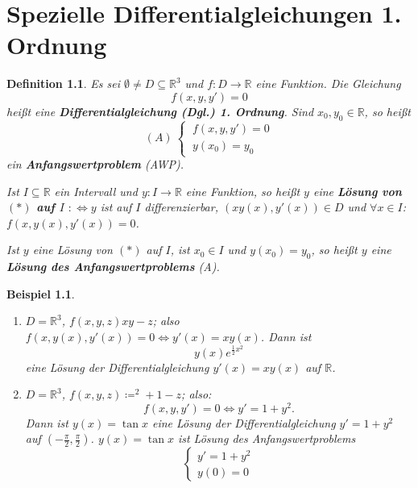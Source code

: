 \documentclass[12pt]{extreport} %
\newcommand{\R}{\mathbb{R}}
\theoremstyle{named}
\theoremstyle{nnamed}
\theoremstyle{itshape}
\newtheorem*{definition}{Definition}
\theoremstyle{normal}
\newtheorem*{beispiel*}{Beispiel}
\begin{document}
\chapter{Spezielle Differentialgleichungen 1. Ordnung}

     
\begin{definition}
	Es sei $\emptyset \neq D \subseteq \R^{3}$ und $f \colon D \rightarrow \R$ eine Funktion. Die Gleichung
	\begin{equation*}
		f(x, y, y') = 0 \tag*{$(*)$}
	\end{equation*}
	hei{\ss}t eine \textbf{Differentialgleichung (Dgl.) 1. Ordnung}. Sind $x_{0}, y_{0} \in \R$, so hei{\ss}t
	$$ (A) ~ \begin{cases} ~ f(x,y,y') = 0 \\ ~ y(x_{0}) = y_{0} \end{cases} $$
	ein \textbf{Anfangswertproblem} (AWP). 
	
	\bigskip
	
	Ist $I \subseteq \R$ ein Intervall und $y \colon I \rightarrow \R$ eine Funktion, so hei{\ss}t $y$ eine \textbf{Lösung von $(*)$ auf $I$} $:\iff y$ ist auf $I$ differenzierbar, $(x y(x), y'(x)) \in D$ und $\forall x \in I$: $f(x,y(x), y'(x)) = 0$.
	
	\bigskip
	
	Ist $y$ eine Lösung von $(*)$ auf $I$, ist $x_{0} \in I$ und $y(x_{0}) = y_{0}$, so hei{\ss}t $y$ eine \textbf{Lösung des Anfangswertproblems} (A).
\end{definition}


\begin{beispiel*} ~\
	\begin{enumerate}
		\item $D = \R^{3}$, $f(x,y,z) xy - z$; also $f(x,y(x), y'(x)) = 0 \iff y'(x) = x y(x)$. Dann ist 
			$$ y(x) e^{\frac{1}{2} x^{2}} $$
			eine Lösung der Differentialgleichung $y'(x) = x y(x)$ auf $\R$.
		\item $D = \R^{3}$, $f(x,y,z) \coloneqq ^{2} + 1 - z$; also: 
			$$ f(x,y,y') = 0 \iff y' = 1 + y^{2}. $$
			Dann ist $y(x) = \tan x$ eine Lösung der Differentialgleichung $y' = 1 + y^{2}$ auf $\left( -\frac{\pi}{2}, \frac{\pi}{2}\right)$. $y(x) = \tan x$ ist Lösung des Anfangswertproblems
			$$ \begin{cases} y' = 1 + y^{2} \\ y(0) = 0 \end{cases} $$
	\end{enumerate}	
\end{beispiel*}
\end{document}
